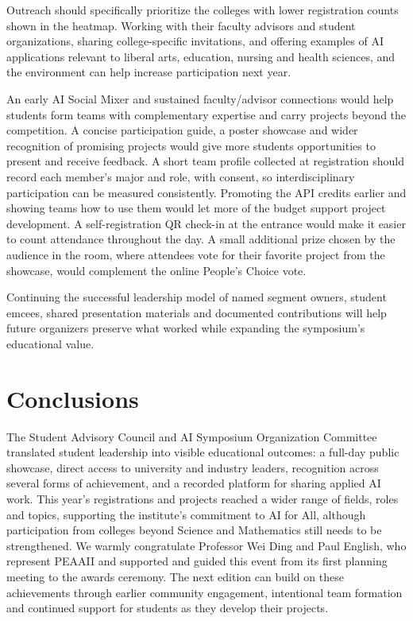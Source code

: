 \documentclass[sigconf,nonacm]{acmart}
\begin{document}
Outreach should specifically prioritize the colleges with lower registration counts shown in the heatmap. Working with their faculty advisors and student organizations, sharing college-specific invitations, and offering examples of AI applications relevant to liberal arts, education, nursing and health sciences, and the environment can help increase participation next year.

An early AI Social Mixer and sustained faculty/advisor connections would help students form teams with complementary expertise and carry projects beyond the competition. A concise participation guide, a poster showcase and wider recognition of promising projects would give more students opportunities to present and receive feedback. A short team profile collected at registration should record each member's major and role, with consent, so interdisciplinary participation can be measured consistently. Promoting the API credits earlier and showing teams how to use them would let more of the budget support project development. A self-registration QR check-in at the entrance would make it easier to count attendance throughout the day. A small additional prize chosen by the audience in the room, where attendees vote for their favorite project from the showcase, would complement the online People's Choice vote.

Continuing the successful leadership model of named segment owners, student emcees, shared presentation materials and documented contributions will help future organizers preserve what worked while expanding the symposium's educational value.

\section{Conclusions}

The Student Advisory Council and AI Symposium Organization Committee translated student leadership into visible educational outcomes: a full-day public showcase, direct access to university and industry leaders, recognition across several forms of achievement, and a recorded platform for sharing applied AI work. This year's registrations and projects reached a wider range of fields, roles and topics, supporting the institute's commitment to AI for All, although participation from colleges beyond Science and Mathematics still needs to be strengthened. We warmly congratulate Professor Wei Ding and Paul English, who represent PEAAII and supported and guided this event from its first planning meeting to the awards ceremony. The next edition can build on these achievements through earlier community engagement, intentional team formation and continued support for students as they develop their projects.
\end{document}
